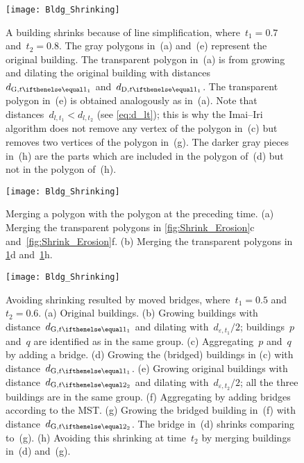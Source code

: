 \begin{figure}[tb]
\centering
\texttt{[image: Bldg\_Shrinking]}
\caption{A building shrinks because of line simplification, 
	where~$t_1=0.7$ and~$t_2=0.8$.
	The gray polygons in~(a) and~(e) 
	represent the original building.
	The transparent polygon in~(a) is from 
	growing and dilating the original building with 
	distances~$\dtrm[1]{G}$ and~$\dtrm[1]{D}$.
	The transparent polygon in~(e) is obtained 
    analogously as in~(a).
	Note that distances~$d_{l,t_1}<d_{l,t_2}$ 
	(see \eq\ref{eq:d_lt});
	this is why the Imai--Iri algorithm does not 
	remove any vertex of the polygon in~(c)
	but removes two vertices of the polygon in~(g).
	The darker gray pieces in~(h) are 
	the parts which are included in the polygon of~(d) 
	but not in the polygon of~(h).
}
\label{fig:Shrink_Simplification}
\end{figure}

\begin{figure}[tb]
\centering
\texttt{[image: Bldg\_Shrinking]}
\caption{Merging a polygon with the polygon 
	at the preceding time.
	(a) Merging the transparent polygons in 
	\figs\ref{fig:Shrink_Erosion}c and~\ref{fig:Shrink_Erosion}f.
	(b) Merging the transparent polygons in 
	\figs\ref{fig:Shrink_Simplification}d 
    and~\ref{fig:Shrink_Simplification}h.
}
\label{fig:Shrink_Uniting}
\end{figure}

\begin{figure}[tb]
\centering
\texttt{[image: Bldg\_Shrinking]}
\caption{Avoiding shrinking resulted by moved bridges,
	where~$t_1=0.5$ and~$t_2=0.6$.
	(a) Original buildings.
	(b) Growing buildings with distance~$\dtrm[1]{G}$ and 
	dilating with~$d_{\varepsilon,t_1}/2$;
	buildings~$p$ and~$q$ are identified as in the same group.
	(c) Aggregating~$p$ and~$q$	by adding a bridge.
	(d) Growing the (bridged) buildings in (c)
	with distance~$\dtrm[1]{G}$.
	(e) Growing original buildings with 
	distance~$\dtrm[2]{G}$ and 
	dilating with~$d_{\varepsilon,t_2}/2$;
	all the three buildings are in the same group.
	(f) Aggregating	by adding bridges according to the MST.
	(g) Growing the bridged building in~(f)
	with distance~$\dtrm[2]{G}$. 
	The bridge in~(d) shrinks comparing to~(g).
	(h) Avoiding this shrinking at time~$t_2$ 
	by merging buildings in~(d) and~(g).
}
\label{fig:BridgeDisappearing}
\end{figure}


